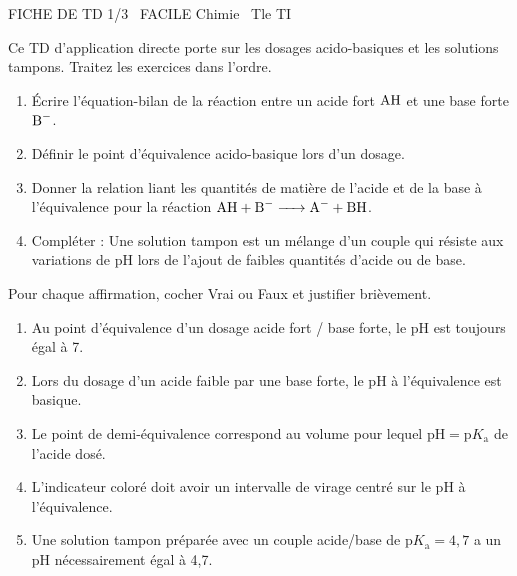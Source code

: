 \documentclass[11pt]{article}
\begin{document}
\begin{tcolorbox}[enhanced,colback=popink,colframe=popink,arc=10pt,boxrule=0pt,left=12pt,right=12pt,top=9pt,bottom=9pt]
{\color{white}\popxbold\small FICHE DE TD 1/3 \textbullet\ FACILE \hfill Chimie \textbullet\ Tle TI\par}
\end{tcolorbox}
\vspace{4pt}
Ce TD d'application directe porte sur les dosages acido-basiques et les solutions tampons. Traitez les exercices dans l'ordre.

\begin{exercice}
\begin{enumerate}
    \item Écrire l'équation-bilan de la réaction entre un acide fort $\ce{AH}$ et une base forte $\ce{B^-}$.
    \item Définir le point d'équivalence acido-basique lors d'un dosage.
    \item Donner la relation liant les quantités de matière de l'acide et de la base à l'équivalence pour la réaction $\ce{AH + B^- -> A^- + BH}$.
    \item Compléter : Une solution tampon est un mélange d'un couple \underline{\hspace{3cm}} qui résiste aux variations de pH lors de l'ajout de faibles quantités d'acide ou de base.
\end{enumerate}
\end{exercice}

\begin{exercice}
Pour chaque affirmation, cocher Vrai ou Faux et justifier brièvement.
\begin{enumerate}
    \item Au point d'équivalence d'un dosage acide fort / base forte, le pH est toujours égal à 7.
    \item Lors du dosage d'un acide faible par une base forte, le pH à l'équivalence est basique.
    \item Le point de demi-équivalence correspond au volume pour lequel $\mathrm{pH} = \mathrm{p}K_\mathrm{a}$ de l'acide dosé.
    \item L'indicateur coloré doit avoir un intervalle de virage centré sur le pH à l'équivalence.
    \item Une solution tampon préparée avec un couple acide/base de $\mathrm{p}K_\mathrm{a} = 4,7$ a un pH nécessairement égal à 4,7.
\end{enumerate}
\end{exercice}
\end{document}
